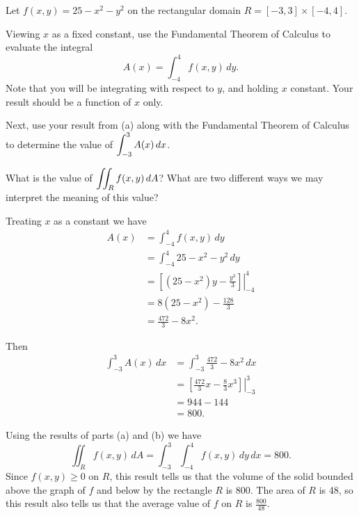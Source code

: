 \begin{activity} \label{A:11.2.1} Let $f(x,y) = 25-x^2-y^2$ on the rectangular domain $R = [-3,3] \times [-4,4]$.
	\ba
	\item Viewing $x$ as a fixed constant, use the Fundamental Theorem of Calculus to evaluate the integral 
	\[A(x) = \int_{-4}^4 f(x,y) \, dy.\]
Note that you will be integrating with respect to $y$, and holding $x$ constant.  Your result should be a function of $x$ only.

	\item Next, use your result from (a) along with the Fundamental Theorem of Calculus to determine the value of $\displaystyle \int_{-3}^3 A(x) \, dx$.
		
	\item What is the value of $\displaystyle \iint_R f(x,y) \, dA$? What are two different ways we may interpret the meaning of this value?
	
	\ea

\end{activity}
\begin{smallhint}

\end{smallhint}
\begin{bighint}

\end{bighint}
\begin{activitySolution}
	\ba
	\item Treating $x$ as a constant we have 
\begin{align*}
A(x) &= \int_{-4}^4 f(x,y) \, dy \\
	&= \int_{-4}^4 25-x^2-y^2 \, dy \\
	&= \left. \left[ (25-x^2)y - \frac{y^3}{3} \right] \right|_{-4}^4 \\
	&= 8(25-x^2) - \frac{128}{3} \\
	&= \frac{472}{3} - 8x^2.
\end{align*}

	\item Then
\begin{align*}
\int_{-3}^3 A(x) \, dx &= \int_{-3}^3 \frac{472}{3} - 8x^2 \, dx \\
	&= \left. \left[ \frac{472}{3}x - \frac{8}{3}x^3 \right] \right|_{-3}^3 \\
	&= 944 - 144 \\
	&= 800.
\end{align*}
	
	\item Using the results of parts (a) and (b) we have 
\[\iint_R f(x,y) \, dA = \int_{-3}^3 \int_{-4}^4 f(x,y) \, dy \, dx = 800.\]
Since $f(x,y) \geq 0$ on $R$, this result tells us that the volume of the solid bounded above the graph of $f$ and below by the rectangle $R$ is 800. The area of $R$ is 48, so this result also tells us that the average value of $f$ on $R$ is $\frac{800}{48}$. 
	
	
	
	\ea
\end{activitySolution}
\aftera
